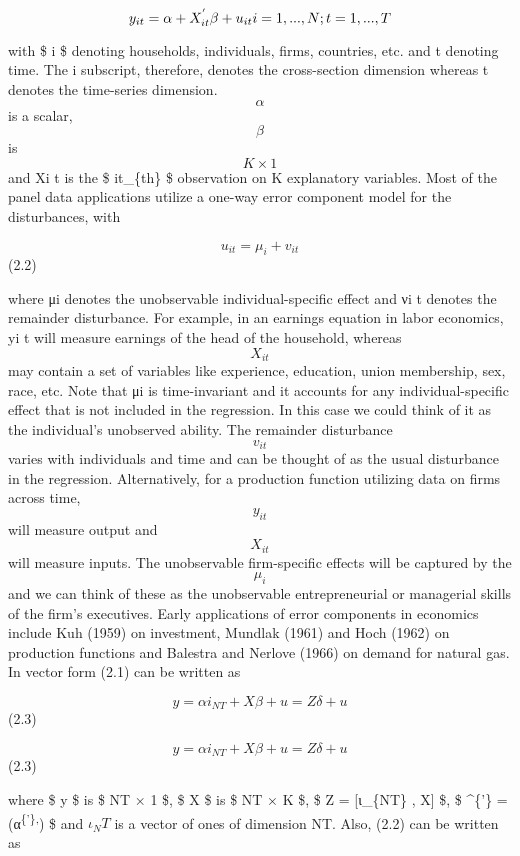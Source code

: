 \documentclass[
]{book}
\begin{document}
\begin{equation}
 y_{it}= \alpha + X_{it}^{'} \beta + u_{it}                      $$ $$ i=1, ... , N  ; t=1, ... ,T 
 \end{equation}

with \$ i \$ denoting households, individuals, firms, countries, etc. and t denoting time. The i subscript, therefore, denotes the cross-section dimension whereas t denotes the time-series dimension. \[ \alpha  \] is a scalar, \[ \beta \] is \[ K × 1 \] and Xi t is the \$ it\_\{th\} \$ observation on K explanatory variables. Most of the panel data applications utilize a one-way error component model for the disturbances, with

\[ u_{it}= \mu_i +  v_{it}      \] (2.2)

where μi denotes the unobservable individual-specific effect and νi t denotes the remainder disturbance. For example, in an earnings equation in labor economics, yi t will measure earnings of the head of the household, whereas \[ X_{it} \] may contain a set of variables like experience, education, union membership, sex, race, etc. Note that μi is time-invariant and it accounts for any individual-specific effect that is not included in the regression. In this case we could think of it as the individual's unobserved ability. The remainder disturbance \[ v_{it} \] varies with individuals and time and can be thought of as the usual disturbance in the regression. Alternatively, for a production function utilizing data on firms across time, \[ y_{it} \] will measure output and \[ X_{it} \] will measure inputs. The unobservable firm-specific effects will be captured by the \[ \mu_i \] and we can think of these as the unobservable entrepreneurial or managerial skills of the firm's executives. Early applications of error components in economics include Kuh (1959) on investment, Mundlak (1961) and Hoch (1962) on production functions and Balestra and Nerlove (1966) on demand for natural gas. In vector form (2.1) can be written as

\begin{equation} y= \alpha i_{NT} + X \beta + u = Z \delta + u     \end{equation} (2.3)

\begin{equation} y= \alpha i_{NT} + X \beta + u = Z \delta + u      \end{equation} (2.3)

where \$ y \$ is \$ NT × 1 \$, \$ X \$ is \$ NT × K \$, \$ Z = {[}ι\_\{NT\} , X{]} \$, \$ \delta\^{}\{'\} = (α\textsuperscript{\{'\},}) \$ and \(ι_NT\) is a vector of ones of dimension NT. Also, (2.2) can be written as
\end{document}
